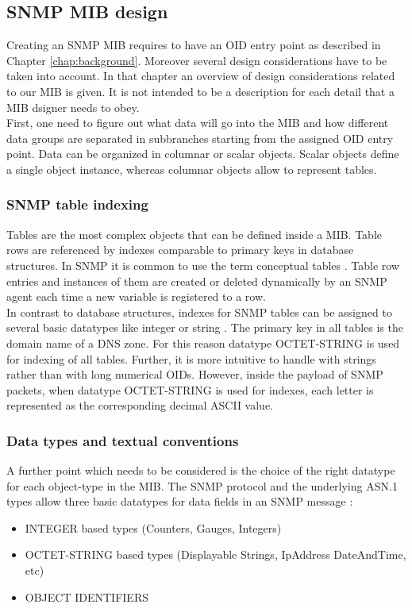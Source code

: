\subsection{SNMP MIB design}
\label{section:mib-module}
Creating an SNMP MIB requires to have an OID entry point as described in Chapter \ref{chap:background}. Moreover several design considerations have to be taken into account. In that chapter an overview of design considerations related to our MIB is given. It is not intended to be a description for each detail that a MIB dsigner needs to obey.
\\
First, one need to  figure out what data will go into the MIB and how different data groups are separated in subbranches starting from the assigned OID entry point. Data can be organized in columnar or scalar objects. Scalar objects define a single object instance, whereas columnar objects allow to represent tables. 

\subsubsection{SNMP table indexing}

Tables are the most complex objects that can be defined inside a MIB. Table rows are referenced by indexes comparable to primary keys in database structures. In SNMP it is common to use the term conceptual tables \cite{perkins}. Table row entries and instances of them are created or deleted dynamically by an SNMP agent each time a new variable is registered to a row. 
\\
In contrast to database structures, indexes for SNMP tables can be assigned to several basic datatypes like integer or string \cite{smiv2}. The primary key in all tables is the domain name of a DNS zone. For this reason datatype OCTET-STRING is used for indexing of all tables. Further, it is more intuitive to handle with strings rather than with long numerical OIDs. However, inside the payload of SNMP packets, when datatype OCTET-STRING is used for indexes, each letter is represented as the corresponding decimal ASCII value. 
\\

\subsubsection{Data types and textual conventions}

A further point which needs to be considered is the choice of the right datatype for each object-type in the MIB. The SNMP protocol and the underlying ASN.1 types allow three basic datatypes for data fields in an SNMP message \cite{snmp-wire}:
\\
\begin{itemize}
\item
INTEGER based types (Counters, Gauges, Integers)
\item
OCTET-STRING based types (Displayable Strings, IpAddress DateAndTime, etc)
\item
OBJECT IDENTIFIERS
\end{itemize}

